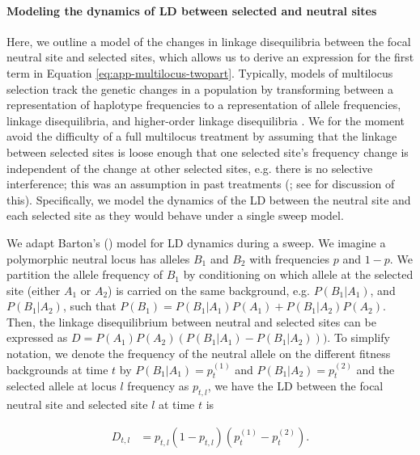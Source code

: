 \documentclass[11pt]{article}
\begin{document}
\paragraph{Modeling the dynamics of LD between selected and neutral sites}
\label{ap:hh-ld}

Here, we outline a model of the changes in linkage disequilibria between the
focal neutral site and selected sites, which allows us to derive an expression
for the first term in Equation \eqref{eq:app-multilocus-twopart}. Typically,
models of multilocus selection track the genetic changes in a population by
transforming between a representation of haplotype frequencies to a
representation of allele frequencies, linkage disequilibria, and higher-order
linkage disequilibria
\parencite{Barton1987-gl,Barton1991-pw,Turelli1988-wi,Turelli1990-kd}. We for
the moment avoid the difficulty of a full multilocus treatment by assuming that
the linkage between selected sites is loose enough that one selected site's
frequency change is independent of the change at other selected sites, e.g.
there is no selective interference; this was an assumption in past treatments
(\cite{Santiago1995-hx,Santiago1998-bs}; see \cite{Barton2000-zg} for
discussion of this). Specifically, we model the dynamics of the LD between the
neutral site and each selected site as they would behave under a single sweep
model.

We adapt Barton's (\citeyear{Barton2000-zg}) model for LD dynamics during a
sweep. We imagine a polymorphic neutral locus has alleles $B_1$ and $B_2$ with
frequencies $p$ and $1-p$. We partition the allele frequency of $B_1$ by
conditioning on which allele at the selected site (either $A_1$ or $A_2$) is
carried on the same background, e.g. $P(B_1 | A_1)$, and $P(B_1 | A_2)$, such
that $P(B_1) = P(B_1 | A_1) P(A_1) + P(B_1 | A_2) P(A_2)$. Then, the linkage
disequilibrium between neutral and selected sites can be expressed as $D =
P(A_1) P(A_2) (P(B_1|A_1) - P(B_1|A_2)))$. To simplify notation, we denote the
frequency of the neutral allele on the different fitness backgrounds at time
$t$ by $P(B_1 | A_1) = p^{(1)}_{t}$ and $P(B_1 | A_2) = p^{(2)}_{t}$ and the
selected allele at locus $l$ frequency as $p_{t,l}$, we have the LD between the
focal neutral site and selected site $l$ at time $t$ is

\begin{align}
  D_{t,l} &= p_{t,l} (1-p_{t,l}) ( p^{(1)}_{t} - p^{(2)}_{t} ).
\end{align}

\end{document}
